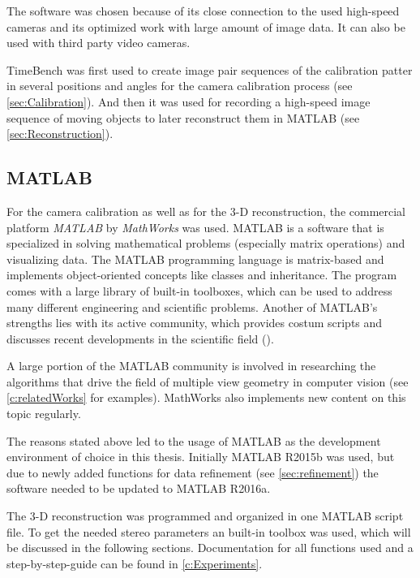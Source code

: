 The software was chosen because of its close connection to the used high-speed cameras and its optimized work with large amount of image data. It can also be used with third party video cameras.

TimeBench was first used to create image pair sequences of the calibration patter in several positions and angles for the camera calibration process (see \autoref{sec:Calibration}). And then it was used for recording a high-speed image sequence of moving objects to later reconstruct them in MATLAB (see \autoref{sec:Reconstruction}). 
\\

\subsection{MATLAB} \label{ssec:Matlab}
For the camera calibration as well as for the 3-D reconstruction, the commercial platform \textit{MATLAB} by \textit{MathWorks} was used. MATLAB is a software that is specialized in solving mathematical problems (especially matrix operations) and visualizing data. The MATLAB programming language is matrix-based and implements object-oriented concepts like classes and inheritance. The program comes with a large library of built-in toolboxes, which can be used to address many different engineering and scientific problems. Another of MATLAB's strengths lies with its active community, which provides costum scripts and discusses recent developments in the scientific field (\cite{MathWorks.2016}).

A large portion of the MATLAB community is involved in researching the algorithms that drive the field of multiple view geometry in computer vision (see \autoref{c:relatedWorks} for examples). MathWorks also implements new content on this topic regularly. 

The reasons stated above led to the usage of MATLAB as the development environment of choice in this thesis. Initially MATLAB R2015b was used, but due to newly added functions for data refinement (see \autoref{sec:refinement}) the software needed to be updated to MATLAB R2016a.
   
The 3-D reconstruction was programmed and organized in one MATLAB script file. To get the needed stereo parameters an built-in toolbox was used, which will be discussed in the following sections. Documentation for all functions used and a step-by-step-guide can be found in \autoref{c:Experiments}.

